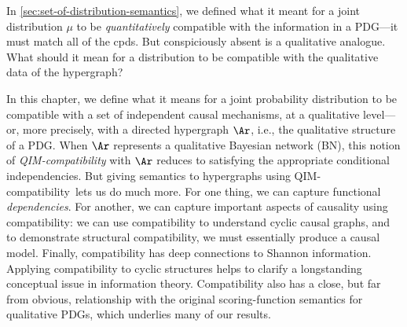 \newcommand\dotmodels{\mathbin{{\models}^{\mathllap{\bullet\,}}_{\vphantom{l}}}}
\newcommand\emodels{\mathbin{{\models}^{\mathllap{e\,}}_{\vphantom{l}}}}

\newcommand\PSEMs{\mathrm{PSEMs}}
\newcommand\PSEMsA{\mathrm{PSEMs}_{\!\Ar}}
\newcommand\Wits{\mathrm{Wits}}

\newcommand\muxor{\mu_{\mathit{xor}}}

\newcommand\hyperarc{hyperarc}
\newcommand\arc{hyperarc}
\newcommand\SQIM{QIM}%
\newcommand\scibility{\SQIM-compatibility}
\newcommand\Scibility{\SQIM-compatibility}
\newcommand\SCibility{\SQIM-Compatibility}

\newcommand\scible{\SQIM-compatible}
\newcommand\escible{E\scible}
\newcommand\cible{compatible}
\newcommand\cibility{compatibility}

\newcommand\partl{partitional}
\newcommand\subpartl{sub\partl}
\newcommand\unipartl{uni\partl}
\newcommand\suppartl{super\partl}
\newcommand\suppartlness{\suppartl ity}

\newcommand\hgraph{hypergraph}


In \cref{sec:set-of-distribution-semantics}, we defined what it meant
for a joint distribution $\mu$ to be \emph{quantitatively} compatible with the information in a PDG---it must match all of the cpds. 
But conspiciously absent is a qualitative analogue. 
What should it mean for a distribution to be compatible with the qualitative data of the hypergraph?


In this chapter, we define what it means for a joint probability distribution to be 
compatible
with a set of independent causal mechanisms,
at a qualitative level---%
or, more precisely, with a directed hypergraph $\Ar$,
i.e., the qualitative structure of a PDG. 
When $\Ar$ represents a qualitative Bayesian network (BN), 
this notion of \emph{\scibility} with $\Ar$
reduces to satisfying the appropriate conditional independencies. 
But giving semantics to hypergraphs using \scibility\ lets us do much more.
For one thing, we can capture functional \emph{dependencies}.
For another, we can capture important aspects of causality using compatibility:
we can use compatibility to understand cyclic causal graphs, and
to demonstrate structural compatibility, we must 
essentially produce a causal model. 
Finally, compatibility has deep connections to 
Shannon information.
Applying compatibility to cyclic structures helps to clarify a
longstanding conceptual issue 
in information theory.
Compatibility also has a close, but far from obvious,
relationship with the original scoring-function semantics for
qualitative PDGs, 
which underlies many of our results.


